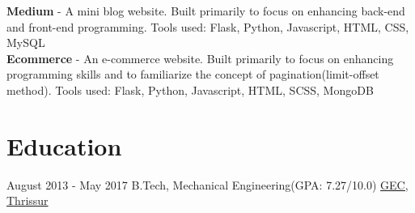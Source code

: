 \documentclass[letterpaper]{twentysecondcv} %
\begin{document}
\textbf{Medium} - A mini blog website. Built primarily to focus on enhancing back-end and front-end programming. Tools used: Flask, Python, Javascript, HTML, CSS, MySQL\\

\textbf{Ecommerce} - An e-commerce website. Built primarily to focus on enhancing programming skills and to familiarize the concept of pagination(limit-offset method). Tools used: Flask, Python, Javascript, HTML, SCSS, MongoDB\\
\section{Education}

\begin{twenty} %
	\twentyitem
    	{August 2013 -}
        {May 2017}
        {B.Tech, Mechanical Engineering\textnormal{(GPA: 7.27/10.0)}}
        {\href{http://www.uoguelph.ca/}{GEC, Thrissur}}
        {}
        {}
\end{twenty}
\end{document}
